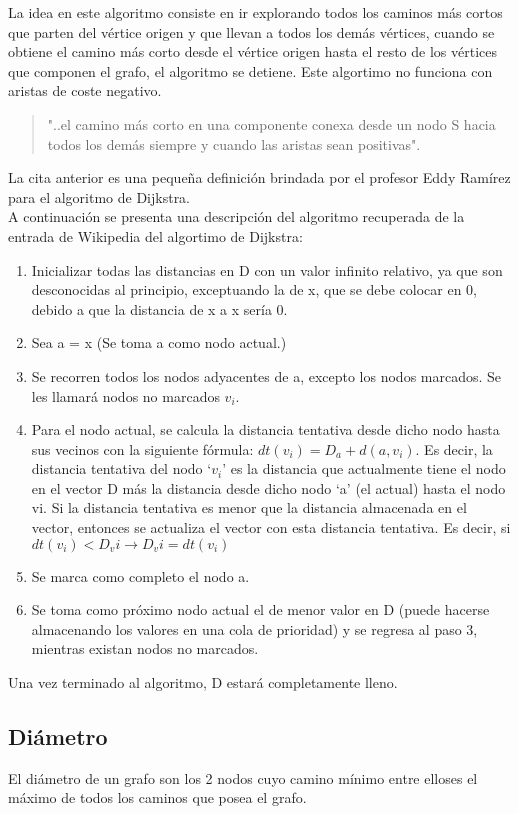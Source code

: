 \documentclass[10pt,a4paper]{article}
\begin{document}
	La idea en este algoritmo consiste en ir explorando todos los caminos más cortos que parten del vértice origen y que llevan a todos los demás vértices, cuando se obtiene el camino más corto desde el vértice origen hasta el resto de los vértices que componen el grafo, el algoritmo se detiene. Este algortimo no funciona con aristas de coste negativo.\\
	
	\begin{quotation}
	"..el camino más corto en una componente conexa desde un nodo S hacia todos los demás siempre y cuando las aristas sean positivas".
	\end{quotation}
La cita anterior es una pequeña definición brindada por el profesor Eddy Ramírez para el algoritmo de Dijkstra.\\
 A continuación se presenta una descripción del algoritmo recuperada de la entrada de Wikipedia del algortimo de Dijkstra:
\begin{enumerate}
\item Inicializar todas las distancias en D con un valor infinito relativo, ya que son desconocidas al principio, exceptuando la de x, que se debe colocar en 0, debido a que la distancia de x a x sería 0.
\item Sea a = x (Se toma a como nodo actual.)
\item Se recorren todos los nodos adyacentes de a, excepto los nodos marcados. Se les llamará nodos no marcados $v_i$.
\item Para el nodo actual, se calcula la distancia tentativa desde dicho nodo hasta sus vecinos con la siguiente fórmula: $dt(v_i) = D_a + d(a,v_i)$. Es decir, la distancia tentativa del nodo ‘$v_i$’ es la distancia que actualmente tiene el nodo en el vector D más la distancia desde dicho nodo ‘a’ (el actual) hasta el nodo vi. Si la distancia tentativa es menor que la distancia almacenada en el vector, entonces se actualiza el vector con esta distancia tentativa. Es decir, si $dt(v_i) < D_vi \rightarrow D_vi = dt(v_i)$
\item Se marca como completo el nodo a.
\item Se toma como próximo nodo actual el de menor valor en D (puede hacerse almacenando los valores en una cola de prioridad) y se regresa al paso 3, mientras existan nodos no marcados.
\end{enumerate} 
Una vez terminado al algoritmo, D estará completamente lleno.\\
\subsection{Diámetro}
El diámetro de un grafo son los 2 nodos cuyo camino mínimo entre elloses el máximo de todos los caminos que posea el grafo.\\
 
\end{document}
